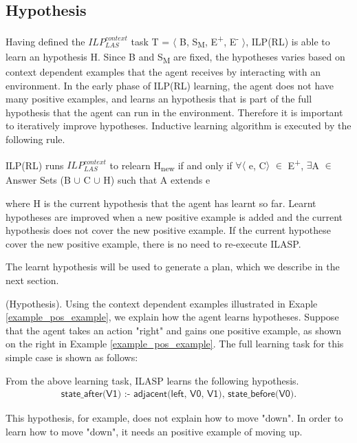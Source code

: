 \subsection{Hypothesis}
\label{sebsec:hypothesis}
Having defined the $ILP_{LAS}^{context}$ task T = $\langle$ B, S\textsubscript{M}, E\textsuperscript{+}, E\textsuperscript{-} $\rangle$, ILP(RL) is able to learn an hypothesis H. 
Since B and S\textsubscript{M} are fixed, the hypotheses varies based on context dependent examples that the agent receives by interacting with an environment.
In the early phase of ILP(RL) learning, the agent does not have many positive examples, and learns an hypothesis that is part of the full hypothesis that the agent can run in the environment.
Therefore it is important to iteratively improve hypotheses. Inductive learning algorithm is executed by the following rule.
\begin{defn}\label{def:ILASP_run}
ILP(RL) runs $ILP_{LAS}^{context}$ to relearn H\textsubscript{new} if and only if $\forall$$\langle$ e, C$\rangle$ $\in$ E\textsuperscript{+}, $\exists$A $\in$ Answer Sets (B $\cup$ C $\cup$ H) such that A extends e
\end{defn}
where H is the current hypothesis that the agent has learnt so far. 
Learnt hypotheses are improved when a new positive example is added and the current hypothesis does not cover the new positive example.
If the current hypothese cover the new positive example, there is no need to re-execute ILASP.

The learnt hypothesis will be used to generate a plan, which we describe in the next section.

\begin{examp} \normalfont (Hypothesis).
Using the context dependent examples illustrated in Exaple \ref{example_pos_example}, we explain how the agent learns hypotheses.
Suppose that the agent takes an action "right" and gains one positive example, as shown on the right in Example \ref{example_pos_example}. 
The full learning task for this simple case is shown as follows:


From the above learning task, ILASP learns the following hypothesis.
\begin{equation}
\begin{split}
\textsf{state\_after(V1) :- adjacent(left, V0, V1), state\_before(V0).}
\end{split}
\end{equation}



This hypothesis, for example, does not explain how to move "down". In order to learn how to move "down", it needs an positive example of moving up.
\end{examp}

